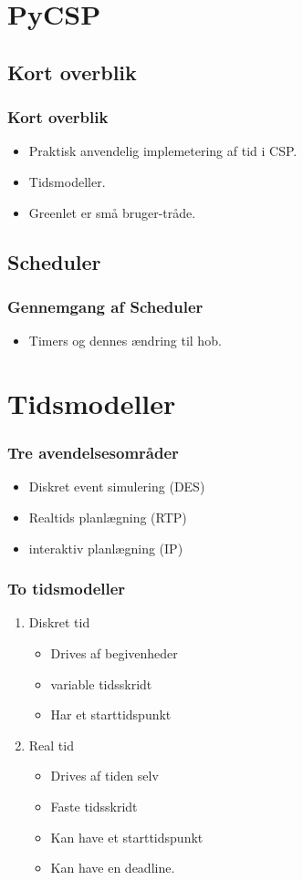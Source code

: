 \documentclass{beamer}
\begin{document}
\section{PyCSP}
\subsection{Kort overblik}
\begin{frame}		
  \frametitle{Kort overblik}
  \begin{itemize}
	\item Praktisk anvendelig implemetering af tid i CSP.
	\item Tidsmodeller.
	\item Greenlet er små bruger-tråde.
  \end{itemize}
\end{frame}

\subsection{Scheduler}
\begin{frame}
  \frametitle{Gennemgang af Scheduler}
  \begin{itemize}
	\item Timers og dennes ændring til hob.
  \end{itemize}
\end{frame}


\section{Tidsmodeller}
\begin{frame}
	\frametitle{Tre avendelsesområder}
	\begin{itemize}
		\item Diskret event simulering (DES)
		\item Realtids planlægning (RTP)
		\item interaktiv planlægning (IP)
	\end{itemize}
\end{frame}

\begin{frame}
	\frametitle{To tidsmodeller}
	\begin{enumerate}
		\item Diskret tid
		\begin{itemize}
			\item Drives af begivenheder
			\item variable tidsskridt
			\item Har et starttidspunkt
 		\end{itemize}
		\item Real tid
		\begin{itemize}
			\item Drives af tiden selv
			\item Faste tidsskridt
			\item Kan have et starttidspunkt
			\item Kan have en deadline.
		\end{itemize}
	\end{enumerate}
\end{frame}
\end{document}
